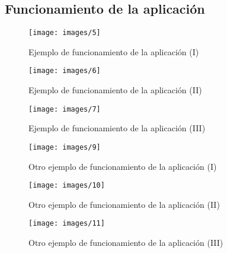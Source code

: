 \subsection{Funcionamiento de la aplicación} %
\label{sub:funcionamiento_de_la_aplicación}

\begin{figure}[htp!]
    \centering
    \texttt{[image: images/5]}
    \caption{Ejemplo de funcionamiento de la aplicación (I)}
    \label{fig:5}
\end{figure}
\begin{figure}[htp!]
    \centering
    \texttt{[image: images/6]}
    \caption{Ejemplo de funcionamiento de la aplicación (II)}
    \label{fig:6}
\end{figure}
\begin{figure}[htp!]
    \centering
    \texttt{[image: images/7]}
    \caption{Ejemplo de funcionamiento de la aplicación (III)}
    \label{fig:7}
\end{figure}
\begin{figure}[htp!]
    \centering
    \texttt{[image: images/9]}
    \caption{Otro ejemplo de funcionamiento de la aplicación (I)}
    \label{fig:9}
\end{figure}
\begin{figure}[htp!]
    \centering
    \texttt{[image: images/10]}
    \caption{Otro ejemplo de funcionamiento de la aplicación (II)}
    \label{fig:10}
\end{figure}
\begin{figure}[htp!]
    \centering
    \texttt{[image: images/11]}
    \caption{Otro ejemplo de funcionamiento de la aplicación (III)}
    \label{fig:11}
\end{figure}
